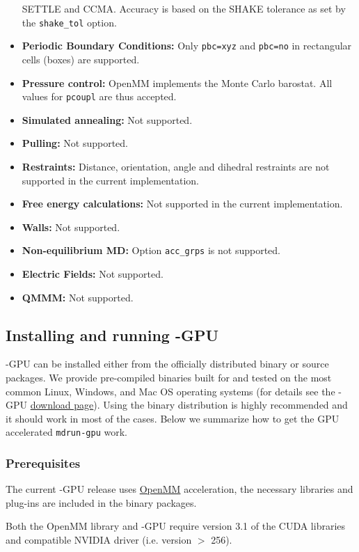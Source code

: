 \begin{itemize}
SETTLE and CCMA. Accuracy is based on the SHAKE tolerance as set by the {\tt shake_tol} option.
\item \textbf{Periodic Boundary Conditions:} Only {\tt pbc=xyz} and {\tt pbc=no} in rectangular cells (boxes) are supported.
\item \textbf{Pressure control:} OpenMM implements the Monte Carlo barostat. All values for {\tt pcoupl} are thus accepted.
\item \textbf{Simulated annealing:} Not supported.
\item \textbf{Pulling:} Not supported. 
\item \textbf{Restraints:} Distance, orientation, angle and dihedral restraints are not supported
in the current implementation.
\item \textbf{Free energy calculations:} Not supported in the current implementation.
\item \textbf{Walls:} Not supported.
\item \textbf{Non-equilibrium MD:} Option {\tt acc_grps} is not supported.
\item \textbf{Electric Fields:} Not supported.
\item \textbf{QMMM:} Not supported.
\end{itemize}

\subsection{Installing and running {\gromacs}-GPU}

{\gromacs}-GPU can be installed either from the officially distributed binary or source packages. 
We provide pre-compiled binaries built for and tested on the most common Linux, Windows, 
and Mac OS operating systems (for details see the {\gromacs}-GPU 
\href{http://www.gromacs.org/gpu}{download page}). 
Using the binary distribution is highly recommended and it should 
work in most of the cases. Below we summarize how to get the GPU accelerated {\tt mdrun-gpu} work.

\subsubsection{Prerequisites}

The current {\gromacs}-GPU release uses \href{https://simtk.org/home/openmm}{OpenMM} 
acceleration, the necessary libraries and plug-ins are included in the binary 
packages. 

Both the OpenMM library and {\gromacs}-GPU require version 3.1 of
the CUDA libraries and compatible NVIDIA driver (i.e. version $>$ 256). 

